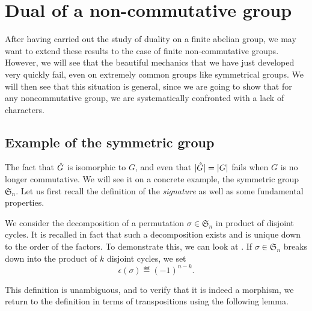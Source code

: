 \section{Dual of a non-commutative group}
\label{sect1-dual-non-commutative-group}

After having carried out the study of duality on a finite abelian group, we may want to extend these results to the case of finite non-commutative groups. However, we will see that the beautiful mechanics that we have just developed very quickly fail, even on extremely common groups like symmetrical groups. We will then see that this situation is general, since we are going to show that for any noncommutative group, we are systematically confronted with a lack of characters.
\subsection{Example of the symmetric group}
\label{sect2-exmp-dual-sn}

  \label{notation-17} The fact that $\hat{G}$ is isomorphic to $G$, and even that $|\hat{G}| = |G|$ fails when $G$ is no longer commutative. We will see it on a concrete example, the symmetric group $\mathfrak{S}_n $. Let us first recall the definition of the \textit{signature} as well as some fundamental properties.

\begin{defn}[Signature]
  We consider the decomposition of a permutation $\sigma \in \mathfrak{S}_n $ in product of disjoint cycles. It is recalled in fact that such a decomposition exists and is unique down to the order of the factors. To demonstrate this, we can look at  \cite{lang}. If $\sigma \in \mathfrak{S}_n $ breaks down into the product of $ k $ disjoint cycles, we set
\begin{equation*}
\epsilon(\sigma) \eqdef (-1)^{n-k}.
\end{equation*}

\end{defn}
This definition is unambiguous, and to verify that it is indeed a morphism, we return to the definition in terms of transpositions using the following lemma.

